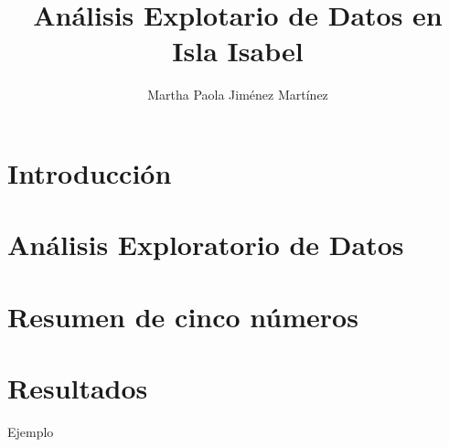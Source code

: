 \documentclass{article}
\author{Martha Paola Jiménez Martínez}
\title{Análisis Explotario de Datos en Isla Isabel}
\begin{document}
 
\section{Introducción}
\section{Análisis Exploratorio de Datos}
\section{Resumen de cinco números}
\section{Resultados}
\begin{table}
\centering
\caption{Ejemplo}
\label{tab:csvResumenCincoNumeros}
\end{table}
\end{document}
